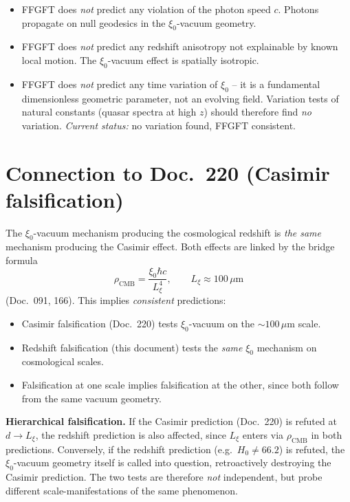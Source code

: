 \begin{itemize}[leftmargin=2em,itemsep=2pt,topsep=2pt]
  \item FFGFT does \emph{not} predict any violation of the photon
        speed $c$. Photons propagate on null geodesics in the
        $\xi_0$-vacuum geometry.
  \item FFGFT does \emph{not} predict any redshift anisotropy not
        explainable by known local motion. The $\xi_0$-vacuum effect
        is spatially isotropic.
  \item FFGFT does \emph{not} predict any time variation of $\xi_0$
        -- it is a fundamental dimensionless geometric parameter,
        not an evolving field. Variation tests of natural constants
        (quasar spectra at high $z$) should therefore find
        \emph{no} variation.
        \emph{Current status:} no variation found, FFGFT consistent.
\end{itemize}

\section{Connection to Doc.~220 (Casimir falsification)}

The $\xi_0$-vacuum mechanism producing the cosmological redshift is
\emph{the same} mechanism producing the Casimir effect. Both effects
are linked by the bridge formula
\begin{equation}
  \rho_\text{CMB} = \frac{\xi_0 \hbar c}{L_\xi^4},
  \qquad
  L_\xi \approx 100\,\mu\text{m}
\end{equation}
(Doc.~091, 166). This implies \emph{consistent} predictions:

\begin{itemize}[leftmargin=2em,itemsep=2pt,topsep=2pt]
  \item Casimir falsification (Doc.~220) tests
        $\xi_0$-vacuum on the $\sim 100\,\mu$m scale.
  \item Redshift falsification (this document) tests the
        \emph{same} $\xi_0$ mechanism on cosmological scales.
  \item Falsification at one scale implies falsification at the
        other, since both follow from the same vacuum geometry.
\end{itemize}

\textbf{Hierarchical falsification.} If the Casimir prediction
(Doc.~220) is refuted at $d \to L_\xi$, the redshift prediction is
also affected, since $L_\xi$ enters via $\rho_\text{CMB}$ in both
predictions. Conversely, if the redshift prediction (e.g.\
$H_0 \neq 66.2$) is refuted, the $\xi_0$-vacuum geometry itself is
called into question, retroactively destroying the Casimir prediction.
The two tests are therefore \emph{not} independent, but probe
different scale-manifestations of the same phenomenon.

